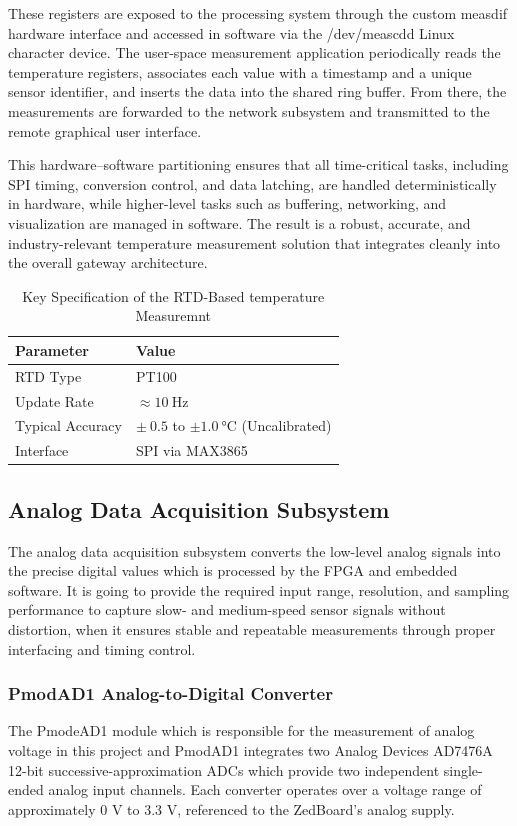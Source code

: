 These registers are exposed to the processing system through the custom measdif hardware interface and accessed in software via the /dev/meascdd Linux character device. The user-space measurement application periodically reads the temperature registers, associates each value with a timestamp and a unique sensor identifier, and inserts the data into the shared ring buffer. From there, the measurements are forwarded to the network subsystem and transmitted to the remote graphical user interface.

This hardware–software partitioning ensures that all time-critical tasks, including SPI timing, conversion control, and data latching, are handled deterministically in hardware, while higher-level tasks such as buffering, networking, and visualization are managed in software. The result is a robust, accurate, and industry-relevant temperature measurement solution that integrates cleanly into the overall gateway architecture.

\begin{table}[H]
	\centering 
	\begin{tabularx}{\textwidth}{|X|X|}
		\hline 
		\textbf{Parameter} & \textbf{Value} \\ \hline 
		RTD Type & PT100 \\ 
		Update Rate & $\approx \SI{10}{\hertz}$ \\ 
		Typical Accuracy & $\pm\ 0.5$ to $\pm \SI{1.0}{\degreeCelsius}$ (Uncalibrated) \\ 
		Interface & SPI via MAX3865 \\ \hline 
	\end{tabularx}
	\caption{Key Specification of the RTD-Based temperature Measuremnt}
\end{table}

\subsection{Analog Data Acquisition Subsystem}
The analog data acquisition subsystem converts the low-level analog signals into the precise digital values which is processed by the FPGA and embedded software. It is going to provide the required input range, resolution, and sampling performance to capture slow- and medium-speed sensor signals without distortion, when it ensures stable and repeatable measurements through proper interfacing and timing control.

\subsubsection{PmodAD1 Analog-to-Digital Converter}
The PmodeAD1 module which is responsible for the measurement of  analog voltage in this project and PmodAD1 integrates two Analog Devices AD7476A 12-bit successive-approximation ADCs which provide two independent single-ended analog input channels. Each converter operates over a voltage range of approximately 0 V to 3.3 V, referenced to the ZedBoard’s analog supply.

